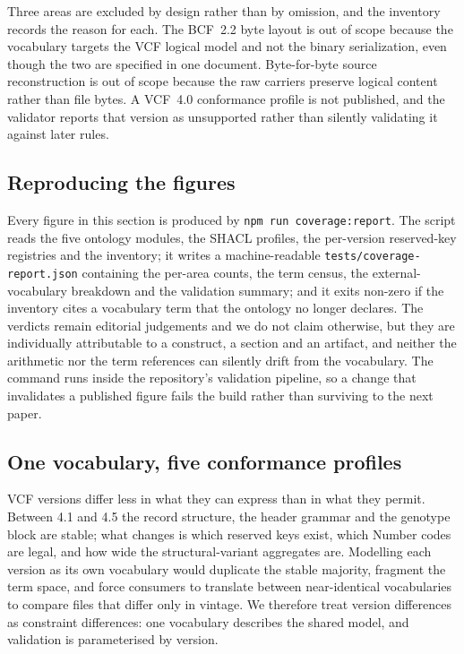 \documentclass{ceurart}
\newcommand{\term}[1]{\texttt{#1}}
\begin{document}
Three areas are excluded by design rather than by omission, and the inventory records the reason for each. The BCF~2.2 byte layout is out of scope because the vocabulary targets the VCF logical model and not the binary serialization, even though the two are specified in one document. Byte-for-byte source reconstruction is out of scope because the raw carriers preserve logical content rather than file bytes. A VCF~4.0 conformance profile is not published, and the validator reports that version as unsupported rather than silently validating it against later rules.

\subsection{Reproducing the figures}

Every figure in this section is produced by \term{npm run coverage:report}. The script reads the five ontology modules, the SHACL profiles, the per-version reserved-key registries and the inventory; it writes a machine-readable \term{tests/coverage-report.json} containing the per-area counts, the term census, the external-vocabulary breakdown and the validation summary; and it exits non-zero if the inventory cites a vocabulary term that the ontology no longer declares. The verdicts remain editorial judgements and we do not claim otherwise, but they are individually attributable to a construct, a section and an artifact, and neither the arithmetic nor the term references can silently drift from the vocabulary. The command runs inside the repository's validation pipeline, so a change that invalidates a published figure fails the build rather than surviving to the next paper.

\subsection{One vocabulary, five conformance profiles}

VCF versions differ less in what they can express than in what they permit. Between 4.1 and 4.5 the record structure, the header grammar and the genotype block are stable; what changes is which reserved keys exist, which Number codes are legal, and how wide the structural-variant aggregates are. Modelling each version as its own vocabulary would duplicate the stable majority, fragment the term space, and force consumers to translate between near-identical vocabularies to compare files that differ only in vintage. We therefore treat version differences as constraint differences: one vocabulary describes the shared model, and validation is parameterised by version.
\end{document}
